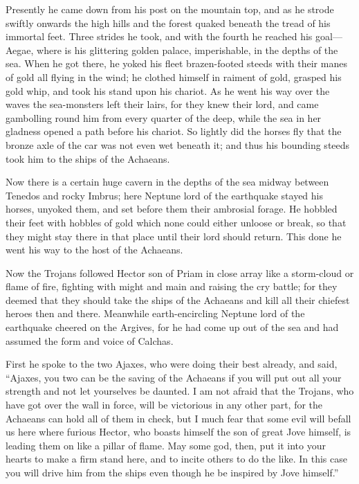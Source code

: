 Presently he came down from his post on the mountain top, and as he strode
swiftly onwards the high hills and the forest quaked beneath the tread of
his immortal feet. Three strides he took, and with the fourth he reached
his goal—Aegae, where is his glittering golden palace, imperishable,
in the depths of the sea. When he got there, he yoked his fleet
brazen-footed steeds with their manes of gold all flying in the wind; he
clothed himself in raiment of gold, grasped his gold whip, and took his
stand upon his chariot. As he went his way over the waves the sea-monsters
left their lairs, for they knew their lord, and came gambolling round him
from every quarter of the deep, while the sea in her gladness opened a
path before his chariot. So lightly did the horses fly that the bronze
axle of the car was not even wet beneath it; and thus his bounding steeds
took him to the ships of the Achaeans.

Now there is a certain huge cavern in the depths of the sea midway between
Tenedos and rocky Imbrus; here Neptune lord of the earthquake stayed his
horses, unyoked them, and set before them their ambrosial forage. He
hobbled their feet with hobbles of gold which none could either unloose or
break, so that they might stay there in that place until their lord should
return. This done he went his way to the host of the Achaeans.

Now the Trojans followed Hector son of Priam in close array like a
storm-cloud or flame of fire, fighting with might and main and raising the
cry battle; for they deemed that they should take the ships of the
Achaeans and kill all their chiefest heroes then and there. Meanwhile
earth-encircling Neptune lord of the earthquake cheered on the Argives,
for he had come up out of the sea and had assumed the form and voice of
Calchas.

First he spoke to the two Ajaxes, who were doing their best already, and
said, “Ajaxes, you two can be the saving of the Achaeans if you will put
out all your strength and not let yourselves be daunted. I am not afraid
that the Trojans, who have got over the wall in force, will be victorious
in any other part, for the Achaeans can hold all of them in check, but I
much fear that some evil will befall us here where furious Hector, who
boasts himself the son of great Jove himself, is leading them on like a
pillar of flame. May some god, then, put it into your hearts to make a
firm stand here, and to incite others to do the like. In this case you
will drive him from the ships even though he be inspired by Jove himself.”


